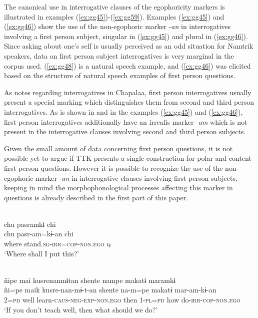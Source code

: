 \documentclass[output=paper]{langsci/langscibook}
\begin{document}
The canonical use in interrogative clauses of the egophoricity markers is illustrated in examples (\ref{ex:gg45})-(\ref{ex:gg59}). Examples (\ref{ex:gg45}) and (\ref{ex:gg46}) show the use of the non-egophoric marker -\textit{an} in interrogatives involving a first person subject, singular in (\ref{ex:gg45}) and plural in (\ref{ex:gg46}). Since asking about one’s self is usually perceived as an odd situation for Namtrik speakers, data on first person subject interrogatives is very marginal in the corpus used. (\ref{ex:gg48}) is a natural speech example, and (\ref{ex:gg46}) was elicited based on the structure of natural speech examples of first person questions.

As \citet[13--14]{Floyd2018} notes regarding interrogatives in Chapalaa, first person interrogatives usually present a special marking which distinguishes them from second and third person interrogatives. As is shown in  and in the examples (\ref{ex:gg45}) and (\ref{ex:gg46}), first person interrogatives additionally have an irrealis marker -\textit{am} which is not present in the interrogative clauses involving second and third person subjects.

Given the small amount of data concerning first person questions, it is not possible yet to argue if TTK presents a single construction for polar and content first person questions. However it is possible to recognize the use of the non-egophoric marker -\textit{an} in interrogative clauses involving first person subjects, keeping in mind the morphophonological processes affecting this marker in questions is already described in the first part of this paper.


\ea \label{ex:gg45}
\\
    \glll chu pasramkɨ chi\\
    chu	 pasr-am=kɨ-an	chi\\
         where	stand.\textsc{sg-irr=cop-non.ego}	\textsc{q}\\
    \glt ‘Where shall I put this?'
\z



\ea \label{ex:gg46}
\\
    \glll ñipe	mai	kusrenanmɨtan shente nampe	makatɨ maramkɨ\\
    ñi=pe maik kusre-nan-mɨ-t-an shente na-m=pe makatɨ	mar-am-kɨ-an\\
         2=\textsc{pd} well learn-\textsc{caus-neg-exp-non.ego} then 1-\textsc{pl=pd}	how	do-\textsc{irr-cop-non.ego}\\
    \glt ‘If you don’t teach well, then what should we do?'
\z
\end{document}
